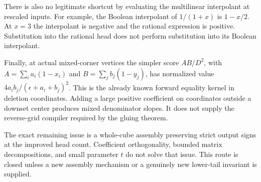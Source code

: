 \documentclass[11pt]{article}
\begin{document}
There is also no legitimate shortcut by evaluating the multilinear
interpolant at rescaled inputs. For example, the Boolean interpolant
of $1/(1+x)$ is $1-x/2$. At $x=3$ the interpolant is negative and
the rational expression is positive. Substitution into the rational
head does not perform substitution into its Boolean interpolant.

Finally, at actual mixed-corner vertices the simpler score
$AB/D^2$, with $A=\sum_i a_i(1-x_i)$ and
$B=\sum_j b_j(1-y_j)$, has normalized value
$4a_i b_j/(\epsilon+a_i+b_j)^2$. This is the already known forward
equality kernel in deletion coordinates. Adding a large positive
coefficient on coordinates outside a downset center produces mixed
denominator slopes. It does not supply the reverse-grid compiler
required by the gluing theorem.

The exact remaining issue is a whole-cube assembly preserving strict
output signs at the improved head count. Coefficient orthogonality,
bounded matrix decompositions, and small parameter $t$ do not solve
that issue. This route is closed unless a new assembly mechanism or
a genuinely new lower-tail invariant is supplied.
\end{document}
